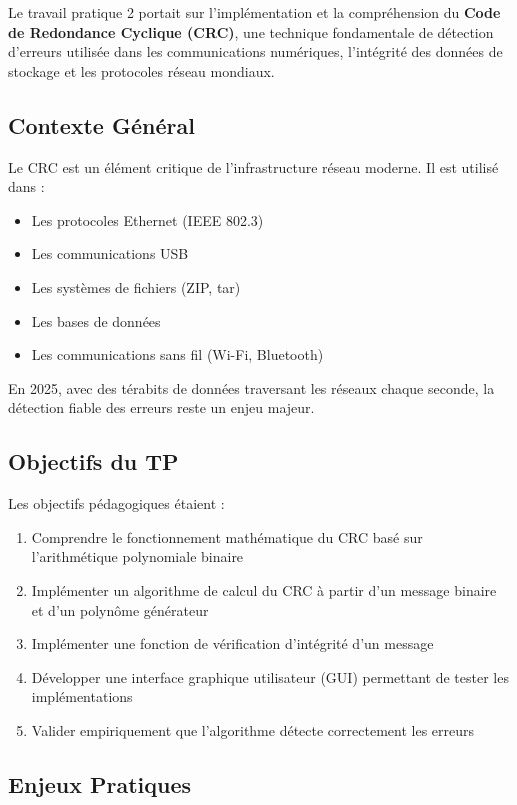 \documentclass[12pt, a4paper]{article}
\begin{document}
Le travail pratique 2 portait sur l'implémentation et la compréhension du \textbf{Code de Redondance Cyclique (CRC)}, une technique fondamentale de détection d'erreurs utilisée dans les communications numériques, l'intégrité des données de stockage et les protocoles réseau mondiaux.

\subsection{Contexte Général}

Le CRC est un élément critique de l'infrastructure réseau moderne. Il est utilisé dans :
\begin{itemize}
    \item Les protocoles Ethernet (IEEE 802.3)
    \item Les communications USB
    \item Les systèmes de fichiers (ZIP, tar)
    \item Les bases de données
    \item Les communications sans fil (Wi-Fi, Bluetooth)
\end{itemize}

En 2025, avec des térabits de données traversant les réseaux chaque seconde, la détection fiable des erreurs reste un enjeu majeur.

\subsection{Objectifs du TP}

Les objectifs pédagogiques étaient :
\begin{enumerate}
    \item Comprendre le fonctionnement mathématique du CRC basé sur l'arithmétique polynomiale binaire
    \item Implémenter un algorithme de calcul du CRC à partir d'un message binaire et d'un polynôme générateur
    \item Implémenter une fonction de vérification d'intégrité d'un message
    \item Développer une interface graphique utilisateur (GUI) permettant de tester les implémentations
    \item Valider empiriquement que l'algorithme détecte correctement les erreurs
\end{enumerate}

\subsection{Enjeux Pratiques}
\end{document}
